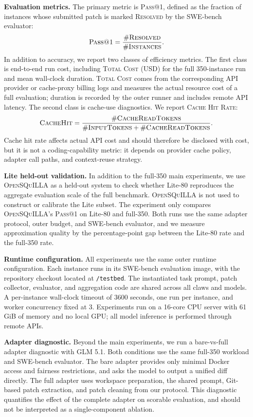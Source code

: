 \textbf{Evaluation metrics.}
The primary metric is \textsc{Pass@1}, defined as the fraction of instances whose submitted patch is marked \textsc{Resolved} by the SWE-bench evaluator:
\[
\textsc{Pass@1} = \frac{\#\textsc{Resolved}}{\#\textsc{Instances}}.
\]
In addition to accuracy, we report two classes of efficiency metrics. The first class is end-to-end run cost, including \textsc{Total Cost} (USD) for the full 350-instance run and mean wall-clock duration. \textsc{Total Cost} comes from the corresponding API provider or cache-proxy billing logs and measures the actual resource cost of a full evaluation; duration is recorded by the outer runner and includes remote API latency. The second class is cache-use diagnostics. We report \textsc{Cache Hit Rate}:
\[
\textsc{CacheHit} = \frac{\#\textsc{CacheReadTokens}}{\#\textsc{InputTokens}+\#\textsc{CacheReadTokens}}.
\]
Cache hit rate affects actual API cost and should therefore be disclosed with cost, but it is not a coding-capability metric: it depends on provider cache policy, adapter call paths, and context-reuse strategy.

\textbf{Lite held-out validation.}
In addition to the full-350 main experiments, we use \textsc{OpenSQuILLA} as a held-out system to check whether Lite-80 reproduces the aggregate evaluation scale of the full benchmark. \textsc{OpenSQuILLA} is not used to construct or calibrate the Lite subset. The experiment only compares \textsc{OpenSQuILLA}'s \textsc{Pass@1} on Lite-80 and full-350. Both runs use the same adapter protocol, outer budget, and SWE-bench evaluator, and we measure approximation quality by the percentage-point gap between the Lite-80 rate and the full-350 rate.

\textbf{Runtime configuration.}
All experiments use the same outer runtime configuration. Each instance runs in its SWE-bench evaluation image, with the repository checkout located at \texttt{/testbed}. The instantiated task prompt, patch collector, evaluator, and aggregation code are shared across all claws and models. A per-instance wall-clock timeout of 3600 seconds, one run per instance, and worker concurrency fixed at 3. Experiments run on a 16-core CPU server with 61 GiB of memory and no local GPU; all model inference is performed through remote APIs.

\textbf{Adapter diagnostic.}
Beyond the main experiments, we run a bare-vs-full adapter diagnostic with GLM 5.1. Both conditions use the same full-350 workload and SWE-bench evaluator. The bare adapter provides only minimal Docker access and fairness restrictions, and asks the model to output a unified diff directly. The full adapter uses workspace preparation, the shared prompt, Git-based patch extraction, and patch cleaning from our protocol. This diagnostic quantifies the effect of the complete adapter on scorable evaluation, and should not be interpreted as a single-component ablation.

